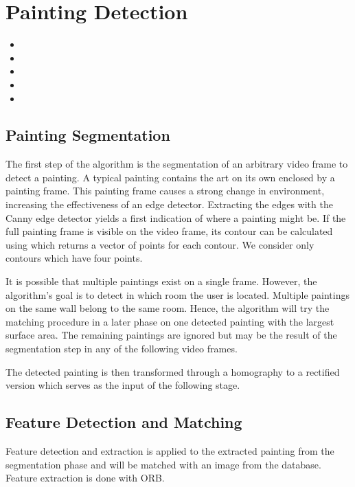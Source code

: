 \section{Painting Detection}
	\begin{itemize}
		\item {}
		\item {}
		\item {}
		\item {}
		\item {}
	\end{itemize}


	\subsection{Painting Segmentation}
	The first step of the algorithm is the segmentation of an arbitrary video frame to detect a painting. A typical painting contains the art on its own enclosed by a painting frame. This painting frame causes a strong change in environment, increasing the effectiveness of an edge detector. Extracting the edges with the Canny edge detector yields a first indication of where a painting might be. If the full painting frame is visible on the video frame, its contour can be calculated using \cite{SUZUKI198532} which returns a vector of points for each contour. We consider only contours which have four points.

	It is possible that multiple paintings exist on a single frame. However, the algorithm's goal is to detect in which room the user is located. Multiple paintings on the same wall belong to the same room. Hence, the algorithm will try the matching procedure in a later phase on one detected painting with the largest surface area. The remaining paintings are ignored but may be the result of the segmentation step in any of the following video frames.

	The detected painting is then transformed through a homography to a rectified version which serves as the input of the following stage.

	\subsection{Feature Detection and Matching}
	Feature detection and extraction is applied to the extracted painting from the segmentation phase and will be matched with an image from the database. Feature extraction is done with ORB.

